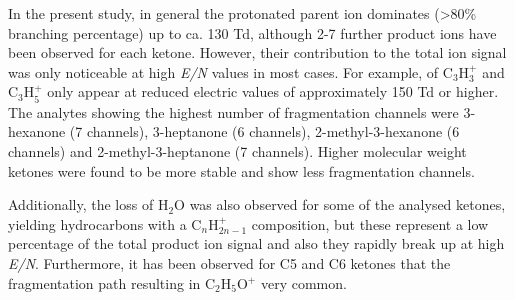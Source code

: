 In the present study, in general the protonated parent ion dominates (>80\% branching percentage) up to ca. 130 Td, although 2-7 further product ions have been observed for each ketone.
However, their contribution to the total ion signal was only noticeable at high \textit{E/N} values in most cases.
For example, of C$_3$H$_3^+$ and C$_3$H$_5^+$  only appear at reduced electric values of approximately 150 Td or higher.
The analytes showing the highest number of fragmentation channels were 3-hexanone (7 channels),
3-heptanone (6 channels),
2-methyl-3-hexanone (6 channels) 
and 2-methyl-3-heptanone (7 channels).
Higher molecular weight ketones were found to be more stable and show less  fragmentation channels.


Additionally, the loss of H$_2$O was also observed for some of the analysed ketones, yielding hydrocarbons with a  C$_n$H$_{2n-1}^{+}$  composition, but these represent a low percentage of the total product ion signal and also they rapidly break up at high \textit{E/N}.
Furthermore, it has been observed for C5 and C6 ketones that the fragmentation path resulting in C$_2$H$_5$O$^+$ very common.


